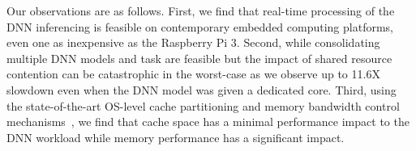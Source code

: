 %
%
%
%
%
%
Our observations are as follows.
First, we find that real-time processing of the DNN inferencing is
feasible on contemporary embedded computing platforms, even one   
as inexpensive as the Raspberry Pi 3. Second, while consolidating
multiple DNN models and task are feasible but the impact of shared
resource contention can be catastrophic in the worst-case as we
observe up to 11.6X slowdown even when the DNN model was given a
dedicated core. Third, using the state-of-the-art OS-level cache
partitioning and memory bandwidth control
mechanisms~\cite{yun2014rtas,Yun2013}, we find that cache space has a
minimal performance impact to the DNN workload while memory
performance has a significant impact.



